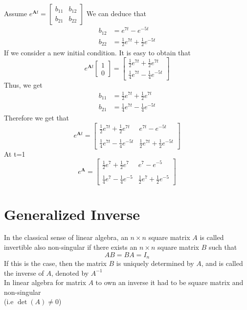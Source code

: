 Assume $ e^{\mathbf{A} t} = \begin{bmatrix}
        b_{11} & b_{12} \\
        b_{21} & b_{22}
    \end{bmatrix}
$
We can deduce that
\begin{align*}
    b_{12} & = e^{7t} - e^{-5t}
    \\
    b_{22} & = \frac{1}{2}e^{7t} +\frac{1}{2} e^{-5t}
\end{align*}
If we consider a new initial condition. It is easy to obtain that
\[
    e^{\mathbf{A} t}
    \begin{bmatrix}
        1 \\
        0
    \end{bmatrix}=\begin{bmatrix}
        \frac{1}{2}e^{7t} + \frac{1}{2}e^{7t} \\
        \frac{1}{4}e^{7t} - \frac{1}{4}e^{-5t}
    \end{bmatrix}
\]
Thus, we get
\begin{align*}
    b_{11} & = \frac{1}{2}e^{7t} + \frac{1}{2}e^{7t}  \\
    b_{21} & = \frac{1}{4}e^{7t} - \frac{1}{4}e^{-5t}
\end{align*}
Therefore we get that
\[
    e^{\mathbf{A}t} =
    \begin{bmatrix}
        \displaystyle \frac{1}{2}e^{7t} + \frac{1}{2}e^{7t}  & e^{7t} - e^{-5t}
        \\\\
        \displaystyle \frac{1}{4}e^{7t} - \frac{1}{4}e^{-5t} & \frac{1}{2}e^{7t} +\frac{1}{2} e^{-5t}
    \end{bmatrix}
\]
At t=1
\[
    e^{\mathbf{A}} =
    \begin{bmatrix}
        \displaystyle \frac{1}{2}e^{7} + \frac{1}{2}e^{7}  & e^{7} - e^{-5}
        \\\\
        \displaystyle \frac{1}{4}e^{7} - \frac{1}{4}e^{-5} & \frac{1}{2}e^{7} +\frac{1}{2} e^{-5}
    \end{bmatrix}
\]

\newpage

\section{Generalized Inverse}

In the classical sense of linear algebra, an $n \times n$ square matrix $A$ is
called invertible also non-singular
if there exists an $n \times n$ square matrix $B$ such that
\[
    AB = BA = I_n
\]
If this is the case, then the matrix $B$ is
uniquely determined by $A$, and is called the
inverse of $A$, denoted by $A^{-1}$
\\
In linear algebra for matrix $A$ to own an inverse
it had to be square matrix and non-singular \\ (i.e $\det(A)\neq0$)
